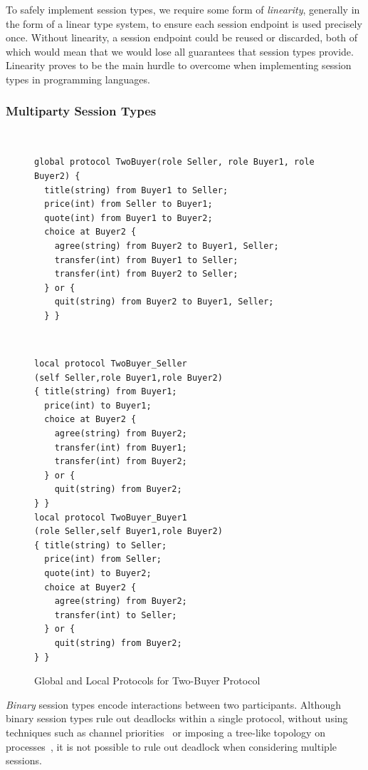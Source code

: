 \documentclass[
graybox,
envcountchap
]{svmult}
\begin{document}
\begin{bibunit}
  To safely implement session types, we require some form of \emph{linearity},
  generally in the form of a linear type system, to ensure each session endpoint
  is used precisely once. Without linearity, a session endpoint could be reused
  or discarded, both of which would mean that we would lose all guarantees that
  session types provide.
  Linearity proves to be the main hurdle to overcome when implementing session
  types in programming languages.

  \subsubsection{Multiparty Session Types}\label{sec:bt:mpst}

  \begin{figure}
~
\begin{lstlisting}[basicstyle=\scriptsize, language = scribble]
global protocol TwoBuyer(role Seller, role Buyer1, role Buyer2) {
  title(string) from Buyer1 to Seller;
  price(int) from Seller to Buyer1;
  quote(int) from Buyer1 to Buyer2;
  choice at Buyer2 {
    agree(string) from Buyer2 to Buyer1, Seller;
    transfer(int) from Buyer1 to Seller;
    transfer(int) from Buyer2 to Seller;
  } or {
    quit(string) from Buyer2 to Buyer1, Seller;
  } }
\end{lstlisting}%
%
~
\begin{lstlisting}[language = scribble, label={lst:scribble-buy1},multicols=2]
local protocol TwoBuyer_Seller
(self Seller,role Buyer1,role Buyer2)
{ title(string) from Buyer1;
  price(int) to Buyer1;
  choice at Buyer2 {
    agree(string) from Buyer2;
    transfer(int) from Buyer1;
    transfer(int) from Buyer2;
  } or {
    quit(string) from Buyer2;
} }
local protocol TwoBuyer_Buyer1
(role Seller,self Buyer1,role Buyer2)
{ title(string) to Seller;
  price(int) from Seller;
  quote(int) to Buyer2;
  choice at Buyer2 {
    agree(string) from Buyer2;
    transfer(int) to Seller;
  } or {
    quit(string) from Buyer2;
} }
\end{lstlisting}
\caption{Global and Local Protocols for Two-Buyer Protocol}
\label{fig:bt:multiparty}
\end{figure}

\emph{Binary} session types encode interactions between two participants.
Although binary session types rule out deadlocks within a single protocol,
without using techniques such as channel
priorities~\cite{Kobayashi06:df-processes,Padovani14:df-pi,DardhaG18:df-processes}
or imposing a tree-like topology on
processes~\cite{CairesP10:logic,Wadler14:prop-sessions,LindleyM15:semantics}, it
is not possible to rule out deadlock when considering multiple sessions.


\end{bibunit}
\end{document}

